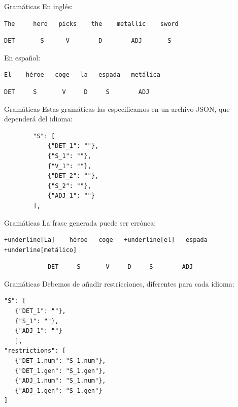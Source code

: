 \begin{frame}[t, fragile]{Gramáticas}
En inglés:

	\begin{Verbatim}
The     hero   picks    the    metallic    sword
	\end{Verbatim}
	\begin{Verbatim}
DET       S      V        D        ADJ       S
	\end{Verbatim}
\vspace*{12px}
En español:
	\begin{Verbatim}
El    héroe   coge   la   espada   metálica
	\end{Verbatim}
	\begin{Verbatim}
DET     S       V     D     S        ADJ
	\end{Verbatim}
\end{frame}

\begin{frame}[t, fragile]{Gramáticas}
Estas gramáticas las especificamos en un archivo JSON, que dependerá del idioma:
	\begin{verbatim}
		"S": [
	    	{"DET_1": ""},
	    	{"S_1": ""},
	    	{"V_1": ""},
	    	{"DET_2": ""},
	    	{"S_2": ""},
	    	{"ADJ_1": ""}
		],
	\end{verbatim}
\end{frame}

\begin{frame}[t, fragile]{Gramáticas}
La frase generada puede ser errónea:
	\vspace*{\fill}
		\begin{Verbatim}[commandchars=+\[\]]
+underline[La]    héroe   coge   +underline[el]   espada   +underline[metálico]
		\end{Verbatim}
		\begin{verbatim}
			DET     S       V     D     S        ADJ
		\end{verbatim}
	\vspace*{\fill}
\end{frame}

\begin{frame}[t, fragile]{Gramáticas}
	Debemos de añadir restricciones, diferentes para cada idioma:
	\begin{verbatim}
"S": [
   {"DET_1": ""},
   {"S_1": ""},
   {"ADJ_1": ""}
   ],
"restrictions": [
   {"DET_1.num": "S_1.num"},
   {"DET_1.gen": "S_1.gen"},
   {"ADJ_1.num": "S_1.num"},
   {"ADJ_1.gen": "S_1.gen"}
]
	\end{verbatim}
\end{frame}

